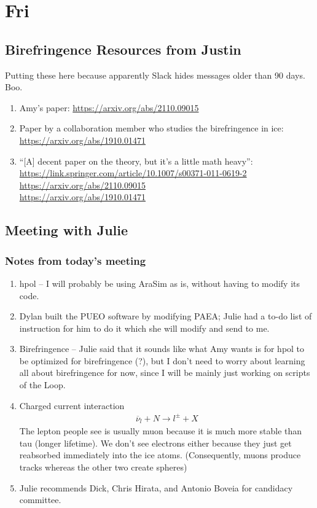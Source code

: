 \documentclass[12pt,letterpaper]{article}
\begin{document}
\section{Fri}
\subsection{Birefringence Resources from Justin}
Putting these here because apparently Slack hides messages older than 90 days. Boo.
\begin{enumerate}
  \item Amy's paper: \url{https://arxiv.org/abs/2110.09015}
  \item Paper by a collaboration member who studies the birefringence in ice:
    \url{https://arxiv.org/abs/1910.01471}
  \item ``[A] decent paper on the theory, but it's a little math heavy'':\\
    \url{https://link.springer.com/article/10.1007/s00371-011-0619-2}\\
    \url{https://arxiv.org/abs/2110.09015}\\
    \url{https://arxiv.org/abs/1910.01471}
\end{enumerate}

\subsection{Meeting with Julie}
\subsubsection{Notes from today's meeting}
\begin{enumerate}
  \item hpol -- I will probably be using AraSim as is, without having to modify its code.
  \item Dylan built the PUEO software by modifying PAEA; Julie had a to-do list
    of instruction for him to do it which she will modify and send to me.
  \item Birefringence -- Julie said that it sounds like what Amy wants is for hpol to be
    optimized for birefringence (?), but I don't need to worry about learning
    all about birefringence for now, since I will be mainly just working on
    scripts of the Loop.
  \item Charged current interaction 
    \begin{align*}
      \overline{\nu}_{l} + N \to l^{\pm} + X
    \end{align*}
    The lepton people see is usually muon because it is much more stable than tau 
    (longer lifetime). We don't see electrons either because they just get reabsorbed
    immediately into the ice atoms. (Consequently, muons produce tracks whereas
    the other two create spheres)
  \item Julie recommends Dick, Chris Hirata, and Antonio Boveia for candidacy committee.
\end{enumerate}
\end{document}
